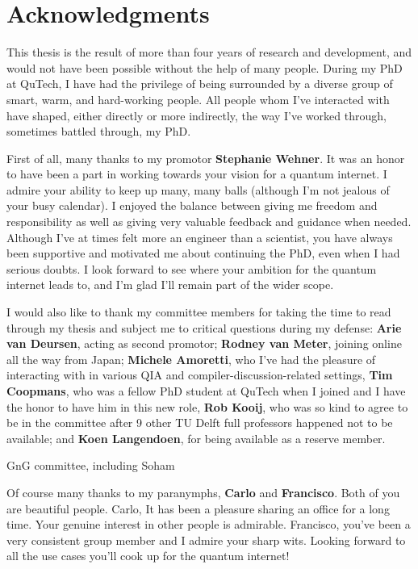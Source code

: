 \chapter*{Acknowledgments}

This thesis is the result of more than four years of research and development, and would not have been possible without the help of many people.
During my PhD at QuTech, I have had the privilege of being surrounded by a diverse group of smart, warm, and hard-working people.
All people whom I've interacted with have shaped, either directly or more indirectly, the way I've worked through, sometimes battled through, my PhD.

First of all, many thanks to my promotor \textbf{Stephanie Wehner}.
It was an honor to have been a part in working towards your vision for a quantum internet.
I admire your ability to keep up many, many balls (although I'm not jealous of your busy calendar).
I enjoyed the balance between giving me freedom and responsibility as well as giving very valuable feedback and guidance when needed.
Although I've at times felt more an engineer than a scientist, you have always been supportive and motivated me about continuing the PhD, even when I had serious doubts.
I look forward to see where your ambition for the quantum internet leads to, and I'm glad I'll remain part of the wider scope.

I would also like to thank my committee members for taking the time to read through my thesis and subject me to critical questions during my defense:
\textbf{Arie van Deursen}, acting as second promotor;
\textbf{Rodney van Meter}, joining online all the way from Japan;
\textbf{Michele Amoretti}, who I've had the pleasure of interacting with in various QIA and compiler-discussion-related settings,
\textbf{Tim Coopmans}, who was a fellow PhD student at QuTech when I joined and I have the honor to have him in this new role,
\textbf{Rob Kooij}, who was so kind to agree to be in the committee after 9 other TU Delft full professors happened not to be available;
and \textbf{Koen Langendoen}, for being available as a reserve member.

GnG committee, including Soham

Of course many thanks to my paranymphs, \textbf{Carlo} and \textbf{Francisco}.
Both of you are beautiful people.
Carlo, It has been a pleasure sharing an office for a long time. Your genuine interest in other people is admirable.
Francisco, you've been a very consistent group member and I admire your sharp wits.
Looking forward to all the use cases you'll cook up for the quantum internet!

